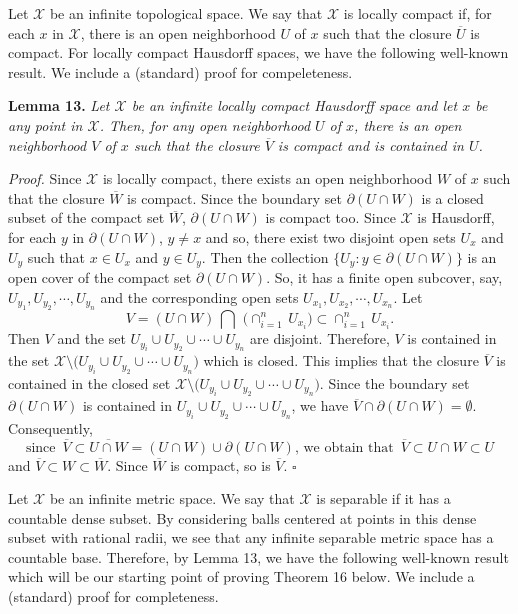 \documentclass[12pt]{article}
\newcommand{\ov}{\overline}
\newcommand{\sq}{$\square$}
\begin{document}
Let $\mathcal X$ be an infinite topological space.  We say that $\mathcal X$ is locally compact if, for each $x$ in $\mathcal X$, there is an open neighborhood $U$ of $x$ such that the closure $\overline U$ is compact.  For locally compact Hausdorff spaces, we have the following well-known result.  We include a (standard) proof for compeleteness.

\noindent
{\bf Lemma 13.} 
{\it Let $\mathcal X$ be an infinite locally compact Hausdorff space and let $x$ be any point in $\mathcal X$.  Then, for any open neighborhood $U$ of $x$, there is an open neighborhood $V$ of $x$ such that the closure $\overline V$ is compact and is contained in $U$.}  

\noindent
{\it Proof.}
Since $\mathcal X$ is locally compact, there exists an open neighborhood $W$ of $x$ such that the closure $\overline W$ is compact.  Since the boundary set $\partial (U \cap W)$ is a closed subset of the compact set $\ov W$, $\partial (U \cap W)$ is compact too.  Since $\mathcal X$ is Hausdorff, for each $y$ in $\partial (U \cap W)$, $y \ne x$ and so, there exist two disjoint open sets $U_x$ and $U_y$ such that $x \in U_x$ and $y \in U_y$.  Then the collection $\big\{ U_y: y \in \partial (U \cap W) \big\}$ is an open cover of the compact set $\partial (U \cap W)$.  So, it has a finite open subcover, say, $U_{y_1}, U_{y_2}, \cdots, U_{y_n}$ and the corresponding open sets $U_{x_1}, U_{x_2}, \cdots, U_{x_n}$.  Let $$V = (U \cap W) \, \bigcap \,\, \bigl(\cap_{i=1}^n \, U_{x_i}\bigr) \subset \cap_{i=1}^n \, U_{x_i}.$$Then $V$ and the set $U_{y_i} \cup U_{y_2} \cup \cdots \cup U_{y_n}$ are disjoint.  Therefore, $V$ is contained in the set $\mathcal X \setminus \bigl(U_{y_i} \cup U_{y_2} \cup \cdots \cup U_{y_n}\bigr)$ which is closed.  This implies that the closure $\ov V$ is contained in the closed set $\mathcal X \setminus \bigl(U_{y_i} \cup U_{y_2} \cup \cdots \cup U_{y_n}\bigr)$.  Since the boundary set $\partial (U \cap W)$ is contained in $U_{y_i} \cup U_{y_2} \cup \cdots \cup U_{y_n}$, we have $\ov V \cap \partial (U \cap W) = \emptyset$.  Consequently, $$\text{since} \,\,\, \ov V \subset \ov {U \cap W} = (U \cap W) \cup \partial (U \cap W), \, \text{we obtain that} \,\,\, \ov V \subset U \cap W \subset U$$and $\ov V \subset W \subset \ov W$.  Since $\ov W$ is compact, so is $\ov V$.
\hfill\sq

Let $\mathcal X$ be an infinite metric space.  We say that $\mathcal X$ is separable if it has a countable dense subset.  By considering balls centered at points in this dense subset with rational radii, we see that any infinite separable metric space has a countable base.  Therefore, by Lemma 13, we have the following well-known result which will be our starting point of proving Theorem 16 below.  We include a (standard) proof for completeness.  
\end{document}
